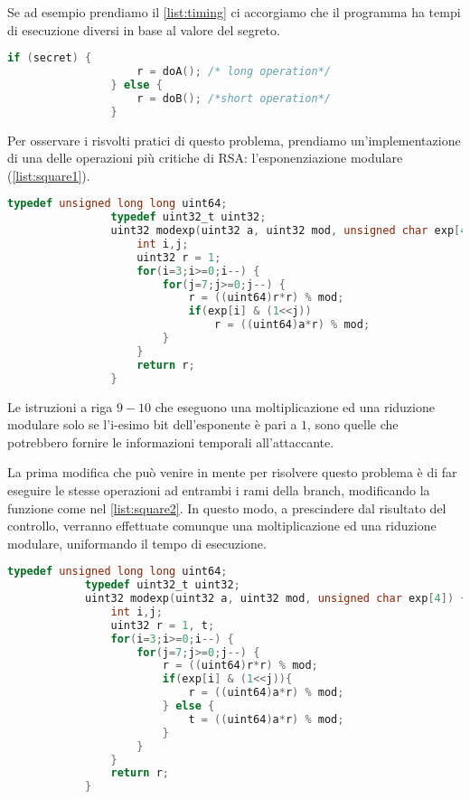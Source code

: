		Se ad esempio prendiamo il \cref{list:timing} ci accorgiamo che il programma ha tempi di esecuzione diversi in base al valore del segreto.
		
		\begin{center}
			\begin{lstlisting}[language={C},caption={codice da proteggere},label={list:timing}]
				if (secret) {
					r = doA(); /* long operation*/
				} else {
					r = doB(); /*short operation*/
				}
			\end{lstlisting}
		\end{center}
		
		Per osservare i risvolti pratici di questo problema, prendiamo un'implementazione di una delle operazioni più critiche di RSA: l'esponenziazione modulare (\cref{list:square1}).
		
		\begin{center}
			\begin{lstlisting}[language={C},caption={RSA, esponenziazione modulare v1},label={list:square1}]
				typedef unsigned long long uint64;
				typedef uint32_t uint32;
				uint32 modexp(uint32 a, uint32 mod, unsigned char exp[4]) {
					int i,j;
					uint32 r = 1;
					for(i=3;i>=0;i--) {
						for(j=7;j>=0;j--) {
							r = ((uint64)r*r) % mod;
							if(exp[i] & (1<<j))
								r = ((uint64)a*r) % mod;
						}
					}
					return r;
				}
			\end{lstlisting}
		\end{center}
		
		Le istruzioni a riga $9-10$ che eseguono una moltiplicazione ed una riduzione modulare solo se l'i-esimo bit dell'esponente è pari a $1$, sono quelle che potrebbero fornire le informazioni temporali all'attaccante.
		
		La prima modifica che può venire in mente per risolvere questo problema è di far eseguire le stesse operazioni ad entrambi i rami della branch, modificando la funzione come nel \cref{list:square2}. In questo modo, a prescindere dal risultato del controllo, verranno effettuate comunque una moltiplicazione ed una riduzione modulare, uniformando il tempo di esecuzione.
		
		\begin{center}
			\begin{lstlisting}[language={C},caption={RSA, esponenziazione modulare v2},label={list:square2}]
			typedef unsigned long long uint64;
			typedef uint32_t uint32;
			uint32 modexp(uint32 a, uint32 mod, unsigned char exp[4]) {
				int i,j;
				uint32 r = 1, t;
				for(i=3;i>=0;i--) {
					for(j=7;j>=0;j--) {
						r = ((uint64)r*r) % mod;
						if(exp[i] & (1<<j)){
							r = ((uint64)a*r) % mod;
						} else {
							t = ((uint64)a*r) % mod;
						}
					}
				}
				return r;
			}
			\end{lstlisting}
		\end{center}
	
